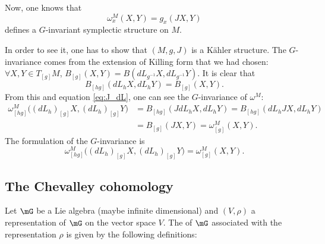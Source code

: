Now, one knows that 
\begin{equation}
  \omega^M_x(X,Y)=g_x(JX,Y)
\end{equation}
defines a $G$-invariant symplectic structure on $M$.

In order to see it, one has to show that $(M,g,J)$ is  a Kähler structure. The $G$-invariance comes from the extension of Killing form that we had chosen: $\forall X,Y\in T_{[g]}M$, $B_{[g]}(X,Y)=B(dL_{g^{-1}}X,dL_{g^{-1}}Y)$.
It is clear that 
\begin{equation}
B_{[hg]}(dL_hX,dL_hY)=B_{[g]}(X,Y).
\end{equation}
From this and equation \eqref{eq:J_dL}, one can see the $G$-invariance of $\omega^M$:
\begin{equation}
\begin{split}
   \omega^M_{[hg]}\big((dL_h)_{[g]}X, (dL_h)_{[g]}Y\big)&=B_{[hg]}(JdL_hX,dL_hY)
                                                =B_{[hg]}(dL_h J X,dL_hY)\\
						&=B_{[g]}(JX,Y)
						=\omega^M_{[g]}(X,Y).   
\end{split}
\end{equation}
The formulation of the $G$-invariance is
\begin{equation}
   \omega^M_{[hg]}\Big( (dL_h)_{[g]}X, (dL_h)_{[g]}Y \Big)=\omega^M_{[g]}(X,Y).
\end{equation}

\subsection{The Chevalley cohomology}

Let $\mG$ be a Lie algebra (maybe infinite dimensional) and $(V,\rho)$ a representation of $\mG$ on the vector space $V$. The  of $\mG$ associated with the representation $\rho$ is given by the following definitions:

